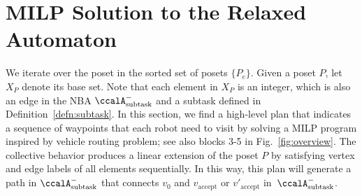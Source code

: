 \documentclass[Afour,sageh,times]{sagej}
\newtheorem{exmp}{Example}
\newcommand{\auto}[1]{\ccalA_{\text{#1}}}
\newenvironment{cexmp}
{\addtocounter{exmp}{-1}\begin{exmp}}
  {\end{exmp}}
\begin{document}


\section{MILP Solution to the Relaxed Automaton}\label{sec:solution}
We iterate over the poset in the  sorted set of posets  $\{P_e\}$. Given a poset $P$, let $X_{P}$ denote its base set. Note that each element in $X_P$ is an integer, which is also an edge in the NBA $\auto{subtask}^-$ and a subtask defined in Definition~\ref{defn:subtask}. In this section, we find a high-level plan that indicates  a sequence of waypoints that each robot need to visit by solving a MILP program inspired by vehicle routing problem; see also blocks 3-5 in Fig.~\ref{fig:overview}. The collective behavior produces a linear extension of the poset $P$ by satisfying vertex and edge labels of all elements sequentially. In this way,  this plan will generate a path in $\auto{subtask}^-$ that connects $v_0$ and $v_{\text{accept}}$ or $v'_{\text{accept}}$ in~$\auto{subtask}^-$.
\end{document}
